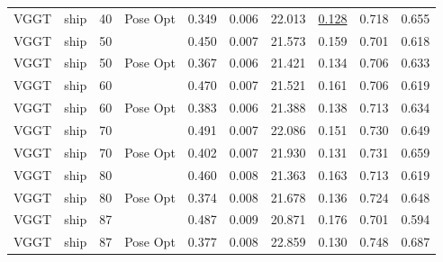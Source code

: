 \begin{table}[H]
\begin{tabular}{llrlrrrrrr}
VGGT & ship & 40 & Pose Opt & 0.349 & 0.006 & 22.013 & \underline{0.128} & 0.718 & 0.655 \\
VGGT & ship & 50 &  & 0.450 & 0.007 & 21.573 & 0.159 & 0.701 & 0.618 \\
VGGT & ship & 50 & Pose Opt & 0.367 & 0.006 & 21.421 & 0.134 & 0.706 & 0.633 \\
VGGT & ship & 60 &  & 0.470 & 0.007 & 21.521 & 0.161 & 0.706 & 0.619 \\
VGGT & ship & 60 & Pose Opt & 0.383 & 0.006 & 21.388 & 0.138 & 0.713 & 0.634 \\
VGGT & ship & 70 &  & 0.491 & 0.007 & 22.086 & 0.151 & 0.730 & 0.649 \\
VGGT & ship & 70 & Pose Opt & 0.402 & 0.007 & 21.930 & 0.131 & 0.731 & 0.659 \\
VGGT & ship & 80 &  & 0.460 & 0.008 & 21.363 & 0.163 & 0.713 & 0.619 \\
VGGT & ship & 80 & Pose Opt & 0.374 & 0.008 & 21.678 & 0.136 & 0.724 & 0.648 \\
VGGT & ship & 87 &  & 0.487 & 0.009 & 20.871 & 0.176 & 0.701 & 0.594 \\
VGGT & ship & 87 & Pose Opt & 0.377 & 0.008 & 22.859 & 0.130 & 0.748 & 0.687 \\
\bottomrule
\end{tabular}
\end{table}